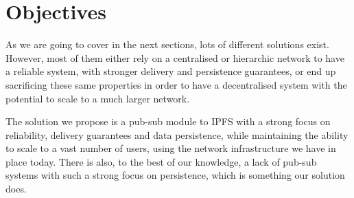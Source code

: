 
%
%

\section{Objectives}

As we are going to cover in the next sections, lots of different
solutions exist. However, most of them either rely on a
centralised or hierarchic network to have a reliable system, with
stronger delivery and persistence guarantees, or end up sacrificing
these same properties in order to have a decentralised system with the
potential to scale to a much larger network.

The solution we propose is a pub-sub module to IPFS with a strong focus
on reliability, delivery guarantees and data persistence, while
maintaining the ability to scale to a vast number of users, using the
network infrastructure we have in place today. There is also, to the
best of our knowledge, a lack of pub-sub systems with such a strong
focus on persistence, which is something our solution does.
